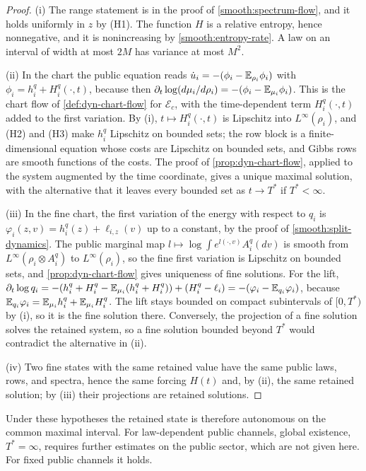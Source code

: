 \begin{proof}
(i) The range statement is in the proof of \cref{smooth:spectrum-flow}, and it holds uniformly in $z$ by (H1). The function $H$ is a relative entropy, hence nonnegative, and it is nonincreasing by \cref{smooth:entropy-rate}. A law on an interval of width at most $2M$ has variance at most $M^2$.

(ii) In the chart the public equation reads $\dot u_i=-(\phi_i-\mathbb E_{\rho_i}\phi_i)$ with $\phi_i=h_i^q+H_i^q(\cdot,t)$, because then $\partial_t\log(d\mu_i/d\rho_i)=-(\phi_i-\mathbb E_{\mu_i}\phi_i)$. This is the chart flow of \cref{def:dyn-chart-flow} for $\mathcal E_c$, with the time-dependent term $H_i^q(\cdot,t)$ added to the first variation. By (i), $t\mapsto H_i^q(\cdot,t)$ is Lipschitz into $L^\infty(\rho_i)$, and (H2) and (H3) make $h_i^q$ Lipschitz on bounded sets; the row block is a finite-dimensional equation whose costs are Lipschitz on bounded sets, and Gibbs rows are smooth functions of the costs. The proof of \cref{prop:dyn-chart-flow}, applied to the system augmented by the time coordinate, gives a unique maximal solution, with the alternative that it leaves every bounded set as $t\to T^*$ if $T^*<\infty$.

(iii) In the fine chart, the first variation of the energy with respect to $q_i$ is $\varphi_i(z,v)=h_i^q(z)+\ell_{i,z}(v)$ up to a constant, by the proof of \cref{smooth:split-dynamics}. The public marginal map $l\mapsto\log\int e^{l(\cdot,v)}A_i^q(dv)$ is smooth from $L^\infty(\rho_i\otimes A_i^q)$ to $L^\infty(\rho_i)$, so the fine first variation is Lipschitz on bounded sets, and \cref{prop:dyn-chart-flow} gives uniqueness of fine solutions. For the lift, $\partial_t\log q_i=-(h_i^q+H_i^q-\mathbb E_{\mu_i}(h_i^q+H_i^q))+(H_i^q-\ell_i)=-(\varphi_i-\mathbb E_{q_i}\varphi_i)$, because $\mathbb E_{q_i}\varphi_i=\mathbb E_{\mu_i}h_i^q+\mathbb E_{\mu_i}H_i^q$. The lift stays bounded on compact subintervals of $[0,T^*)$ by (i), so it is the fine solution there. Conversely, the projection of a fine solution solves the retained system, so a fine solution bounded beyond $T^*$ would contradict the alternative in (ii).

(iv) Two fine states with the same retained value have the same public laws, rows, and spectra, hence the same forcing $H(t)$ and, by (ii), the same retained solution; by (iii) their projections are retained solutions.
\end{proof}

Under these hypotheses the retained state is therefore autonomous on the common maximal interval. For law-dependent public channels, global existence, $T^*=\infty$, requires further estimates on the public sector, which are not given here. For fixed public channels it holds.

